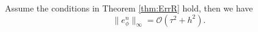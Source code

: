 \documentclass{m2an}
\newcommand{\mo}{\mathcal{O}}
\begin{document}
\begin{thrm}\label{thm:ErrPhi} 
	Assume the conditions in Theorem \ref{thm:ErrR} hold, %
	then we have
	\begin{equation}\label{thmErrPhi:1}
		\| e_\phi^{n} \|_{\infty} =\mo ( \tau^2 + h^2 ).
	\end{equation}
\end{thrm}
\end{document}
